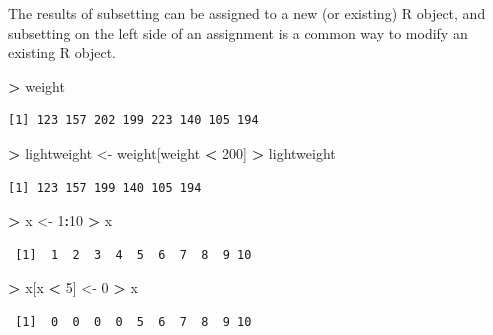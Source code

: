 \documentclass[]{krantz}
\makeatletter
\newenvironment{Shaded}{\begin{snugshade}}{\end{snugshade}}
\newcommand{\DecValTok}[1]{\textcolor[rgb]{0.06,0.06,0.06}{#1}}
\newcommand{\NormalTok}[1]{#1}
\newcommand{\OperatorTok}[1]{\textcolor[rgb]{0.43,0.43,0.43}{\textbf{#1}}}
\newcommand{\StringTok}[1]{\textcolor[rgb]{0.5,0.5,0.5}{#1}}
\newenvironment{kframe}{%
\medskip{}
\setlength{\fboxsep}{.8em}
 \def\at@end@of@kframe{}%
 \ifinner\ifhmode%
  \def\at@end@of@kframe{\end{minipage}}%
  \begin{minipage}{\columnwidth}%
 \fi\fi%
 \def\FrameCommand##1{\hskip\@totalleftmargin \hskip-\fboxsep
 \colorbox{shadecolor}{##1}\hskip-\fboxsep
     \hskip-\linewidth \hskip-\@totalleftmargin \hskip\columnwidth}%
 \MakeFramed {\advance\hsize-\width
   \@totalleftmargin\z@ \linewidth\hsize
   \@setminipage}}%
 {\par\unskip\endMakeFramed%
 \at@end@of@kframe}
\renewenvironment{Shaded}{\begin{kframe}}{\end{kframe}}
\makeatother
\begin{document}
The results of subsetting can be assigned to a new (or existing) R object, and subsetting on the left side of an assignment is a common way to modify an existing R object.

\begin{Shaded}
\begin{Highlighting}[]
\OperatorTok{>}\StringTok{ }\NormalTok{weight}
\end{Highlighting}
\end{Shaded}

\begin{verbatim}
[1] 123 157 202 199 223 140 105 194
\end{verbatim}

\begin{Shaded}
\begin{Highlighting}[]
\OperatorTok{>}\StringTok{ }\NormalTok{lightweight <-}\StringTok{ }\NormalTok{weight[weight }\OperatorTok{<}\StringTok{ }\DecValTok{200}\NormalTok{]}
\OperatorTok{>}\StringTok{ }\NormalTok{lightweight}
\end{Highlighting}
\end{Shaded}

\begin{verbatim}
[1] 123 157 199 140 105 194
\end{verbatim}

\begin{Shaded}
\begin{Highlighting}[]
\OperatorTok{>}\StringTok{ }\NormalTok{x <-}\StringTok{ }\DecValTok{1}\OperatorTok{:}\DecValTok{10}
\OperatorTok{>}\StringTok{ }\NormalTok{x}
\end{Highlighting}
\end{Shaded}

\begin{verbatim}
 [1]  1  2  3  4  5  6  7  8  9 10
\end{verbatim}

\begin{Shaded}
\begin{Highlighting}[]
\OperatorTok{>}\StringTok{ }\NormalTok{x[x }\OperatorTok{<}\StringTok{ }\DecValTok{5}\NormalTok{] <-}\StringTok{ }\DecValTok{0}
\OperatorTok{>}\StringTok{ }\NormalTok{x}
\end{Highlighting}
\end{Shaded}

\begin{verbatim}
 [1]  0  0  0  0  5  6  7  8  9 10
\end{verbatim}
\end{document}
